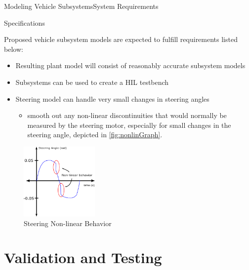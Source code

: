\documentclass{beamer}
\begin{document}
%



\begin{frame}{Modeling Vehicle Subsystems}{System Requirements}
	\begin{block}{Specifications}
	\begin{minipage}[t]{0.62\linewidth}    
    Proposed vehicle subsystem models are expected to fulfill requirements listed below:
	\begin{itemize}
    		\item Resulting plant model will consist of reasonably accurate subsystem models
    		\item Subsystems can be used to create a HIL testbench
    		\item Steering model can handle very small changes in steering angles
    \begin{itemize}
		\item smooth out any non-linear discontinuities that would normally be measured by the steering motor, especially for small changes in the steering angle, depicted in \autoref{fig:nonlinGraph}.
    \end{itemize}
	\end{itemize}
	\end{minipage}
	\begin{minipage}[t]{0.34\linewidth}
	\begin{figure}[h]
		\centering
    		\captionsetup{justification=centering, margin=0.5cm}
    		\includegraphics[width=1.5in]{figs/inkscape/nonlinearBehavior}
    		\caption{Steering Non-linear Behavior}
    		\label{fig:nonlinGraph}
	\end{figure}
	\end{minipage}
\end{block}
\end{frame}
\section{Validation and Testing}
\end{document}

